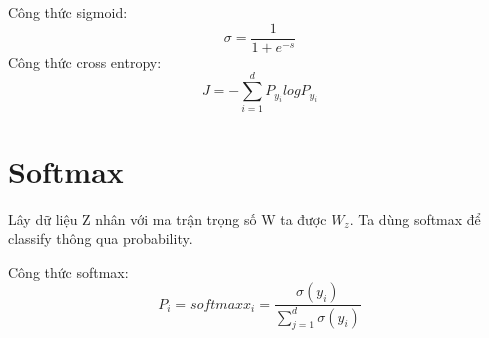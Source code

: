 \documentclass{article}
\begin{document}
Công thức sigmoid:
$$\sigma = \frac{1}{1+e^{-s}}$$
Công thức cross entropy:
$$ J = -\sum_{i=1} ^{d} P_y_i logP_y_i $$

\section{Softmax}
 Lây dữ liệu Z nhân với ma trận trọng số W ta được $W_z$. Ta dùng softmax để classify thông qua probability.

Công thức softmax: 
$$P_i = softmax x_i = \frac{\sigma (y_i)}{\sum_{j=1}^{d}\sigma(y_i)}$$
\end{document}
